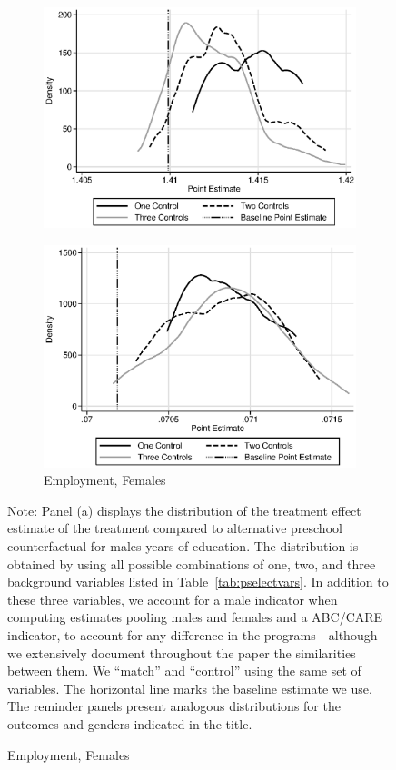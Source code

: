 \begin{figure}
\begin{subfigure}[h]{0.4\textwidth}
		\includegraphics[width=\textwidth]{output/sencontrols_female_years_30y_epan_ipw_P1.eps}
\end{subfigure}%
\begin{subfigure}[h]{0.4\textwidth}
	\centering
	\caption{Employment, Females}
		\includegraphics[width=\textwidth]{output/sencontrols_female_si30y_works_epan_ipw_P1.eps}
\end{subfigure}
\footnotesize \justify
Note: Panel (a) displays the distribution of the treatment effect estimate of the treatment compared to alternative preschool counterfactual for males years of education. The distribution is obtained by using all possible combinations of one, two, and three background variables listed in Table~\ref{tab:pselectvars}. In addition to these three variables, we account for a male indicator when computing estimates pooling males and females and a ABC/CARE indicator, to account for any difference in the programs---although we extensively document throughout the paper the similarities between them. We ``match'' and ``control'' using the same set of variables. The horizontal line marks the baseline estimate we use. The reminder panels present analogous distributions for the outcomes and genders indicated in the title.\\
\end{figure}

